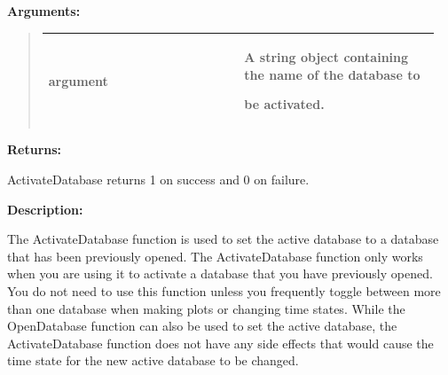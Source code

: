 \documentclass[letterpaper,10pt,english]{sphinxmanual}
\begin{document}
\begin{DUlineblock}{0em}
\item[] 
\item[] \textbf{Arguments:}
\end{DUlineblock}
\begin{quote}

\begin{tabular}{|p{0.475\linewidth}|p{0.475\linewidth}|}
\hline

argument
 & 
\begin{DUlineblock}{0em}
\item[] A string object containing the name of the database to
\item[] be activated.
\end{DUlineblock}
\\
\hline\end{tabular}

\end{quote}

\begin{DUlineblock}{0em}
\item[] 
\item[] \textbf{Returns:}
\item[] ActivateDatabase returns 1 on success and 0 on failure.
\item[] 
\item[] \textbf{Description:}
\item[] The ActivateDatabase function is used to set the active database to a
database that has been previously opened. The ActivateDatabase function
only works when you are using it to activate a database that you have
previously opened. You do not need to use this function unless you
frequently toggle between more than one database when making plots or
changing time states. While the OpenDatabase function can also be used
to set the active database, the ActivateDatabase function does not have any
side effects that would cause the time state for the new active database
to be changed.
\end{DUlineblock}

\begin{DUlineblock}{0em}
\item[] 
\end{DUlineblock}
\end{document}
